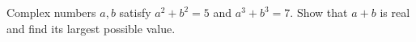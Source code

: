 Complex numbers $a,b$ satisfy $a^2+b^2=5$ and $a^3+b^3=7$. Show that $a+b$ is real and find its largest possible value.
